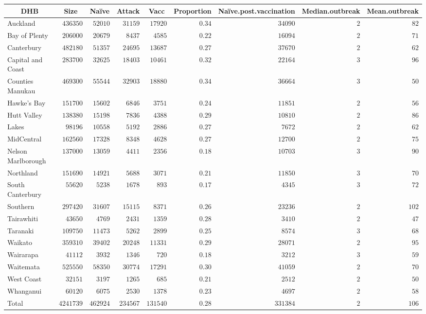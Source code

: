 \documentclass{article}
\begin{document}
\begin{table}
\begin{center}
\begin{tabular}{lrrrrrrrr}
\hline\hline
\multicolumn{1}{c}{DHB}&\multicolumn{1}{c}{Size}&\multicolumn{1}{c}{Naïve}&\multicolumn{1}{c}{Attack}&\multicolumn{1}{c}{Vacc}&\multicolumn{1}{c}{Proportion}&\multicolumn{1}{c}{Naïve.post.vaccination}&\multicolumn{1}{c}{Median.outbreak}&\multicolumn{1}{c}{Mean.outbreak}\tabularnewline
\hline
Auckland&$ 436350$&$ 52010$&$ 31159$&$ 17920$&$0.34$&$ 34090$&$2$&$ 82$\tabularnewline
Bay of Plenty&$ 206000$&$ 20679$&$  8437$&$  4585$&$0.22$&$ 16094$&$2$&$ 71$\tabularnewline
Canterbury&$ 482180$&$ 51357$&$ 24695$&$ 13687$&$0.27$&$ 37670$&$2$&$ 62$\tabularnewline
Capital and Coast&$ 283700$&$ 32625$&$ 18403$&$ 10461$&$0.32$&$ 22164$&$3$&$ 96$\tabularnewline
Counties Manukau&$ 469300$&$ 55544$&$ 32903$&$ 18880$&$0.34$&$ 36664$&$3$&$ 50$\tabularnewline
Hawke's Bay&$ 151700$&$ 15602$&$  6846$&$  3751$&$0.24$&$ 11851$&$2$&$ 56$\tabularnewline
Hutt Valley&$ 138380$&$ 15198$&$  7836$&$  4388$&$0.29$&$ 10810$&$2$&$ 86$\tabularnewline
Lakes&$  98196$&$ 10558$&$  5192$&$  2886$&$0.27$&$  7672$&$2$&$ 62$\tabularnewline
MidCentral&$ 162560$&$ 17328$&$  8348$&$  4628$&$0.27$&$ 12700$&$2$&$ 75$\tabularnewline
Nelson Marlborough&$ 137000$&$ 13059$&$  4411$&$  2356$&$0.18$&$ 10703$&$3$&$ 90$\tabularnewline
Northland&$ 151690$&$ 14921$&$  5688$&$  3071$&$0.21$&$ 11850$&$3$&$ 70$\tabularnewline
South Canterbury&$  55620$&$  5238$&$  1678$&$   893$&$0.17$&$  4345$&$3$&$ 72$\tabularnewline
Southern&$ 297420$&$ 31607$&$ 15115$&$  8371$&$0.26$&$ 23236$&$2$&$102$\tabularnewline
Tairawhiti&$  43650$&$  4769$&$  2431$&$  1359$&$0.28$&$  3410$&$2$&$ 47$\tabularnewline
Taranaki&$ 109750$&$ 11473$&$  5262$&$  2899$&$0.25$&$  8574$&$3$&$ 68$\tabularnewline
Waikato&$ 359310$&$ 39402$&$ 20248$&$ 11331$&$0.29$&$ 28071$&$2$&$ 95$\tabularnewline
Wairarapa&$  41112$&$  3932$&$  1346$&$   720$&$0.18$&$  3212$&$3$&$ 59$\tabularnewline
Waitemata&$ 525550$&$ 58350$&$ 30774$&$ 17291$&$0.30$&$ 41059$&$2$&$ 70$\tabularnewline
West Coast&$  32151$&$  3197$&$  1265$&$   685$&$0.21$&$  2512$&$2$&$ 50$\tabularnewline
Whanganui&$  60120$&$  6075$&$  2530$&$  1378$&$0.23$&$  4697$&$2$&$ 58$\tabularnewline
Total&$4241739$&$462924$&$234567$&$131540$&$0.28$&$331384$&$2$&$106$\tabularnewline
\hline
\end{tabular}\end{center}\label{table:vacp}
\end{table}
\end{document}
